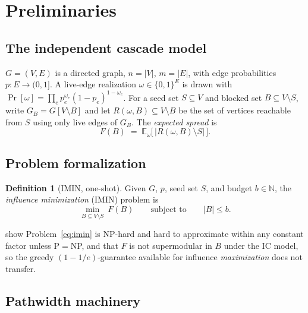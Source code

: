 \documentclass[preprint,11pt]{elsarticle}
\theoremstyle{definition}
\newtheorem{definition}{Definition}
\theoremstyle{remark}
\newcommand{\Rspread}{R}
\newcommand{\FF}{F}
\begin{document}
\section{Preliminaries}\label{sec:prelim}
\subsection{The independent cascade model}\label{sec:ic-model}

$G=(V,E)$ is a directed graph,
$n=|V|$, $m=|E|$, with edge probabilities $p:E\to(0,1]$. A live-edge
realization $\omega\in\{0,1\}^E$ is drawn with
$\Pr[\omega]=\prod_{e}p_e^{\omega_e}(1-p_e)^{1-\omega_e}$. For a seed set
$S\subseteq V$ and blocked set $B\subseteq V\setminus S$, write
$G_B=G[V\setminus B]$ and let $\Rspread(\omega,B)\subseteq V\setminus B$ be
the set of vertices reachable from $S$ using only live edges of $G_B$. The
\emph{expected spread} is
\begin{equation}\label{eq:spread}
\FF(B)\;=\;\mathbb E_\omega\bigl[\,|\Rspread(\omega,B)\setminus S|\,\bigr].
\end{equation}

\subsection{Problem formalization}\label{sec:formalization}

\begin{definition}[IMIN, one-shot]\label{def:imin}
Given $G$, $p$, seed set $S$, and budget $b\in\mathbb N$, the
\emph{influence minimization} (IMIN) problem is
\begin{equation}\label{eq:imin}
\min_{B\subseteq V\setminus S}\ \FF(B)
\qquad\text{subject to}\qquad
|B|\le b.
\end{equation}
\end{definition}

\noindent \citet{xie2023} show Problem~\eqref{eq:imin} is NP-hard and hard
to approximate within any constant factor unless P$=$NP, and that $\FF$ is
not supermodular in $B$ under the IC model, so the greedy
$(1-1/e)$-guarantee available for influence \emph{maximization}
\citep{kempe2003} does not transfer.

\subsection{Pathwidth machinery}\label{sec:treewidth-prelim}
\end{document}
